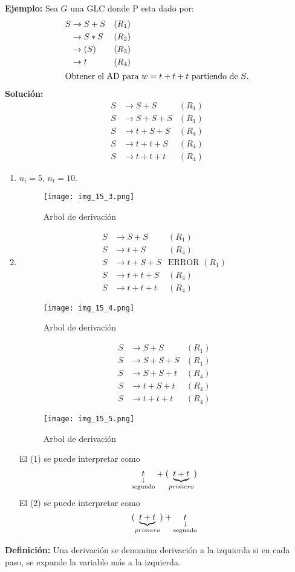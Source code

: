 \textbf{Ejemplo: }Sea $G$ una GLC donde P esta dado por:
\begin{align*}
S	&\rightarrow S+S	&(R_1)	\\
	&\rightarrow S*S	&(R_2)	\\
	&\rightarrow (S)	&(R_3)	\\
	&\rightarrow t		&(R_4)	\\
\intertext{Obtener el AD para $w=t+t+t$ partiendo de $S$.}
\end{align*}
\textbf{Solución: }
\begin{align*}
S	&\rightarrow S+S	&(R_1)	\\
S	&\rightarrow S+S+S	&(R_1)	\\
S	&\rightarrow t+S+S	&(R_4)	\\
S	&\rightarrow t+t+S	&(R_4)	\\
S	&\rightarrow t+t+t	&(R_4)
\end{align*}
\begin{enumerate}
\item $n_i=5$, $n_t=10$.
\begin{figure}[h!]
\centering
\texttt{[image: img\_15\_3.png]}
\caption{Arbol de derivación}\label{img_15_3}
\end{figure}
\item 
\begin{align*}
S	&\rightarrow S+S	&(R_1)	\\
S	&\rightarrow t+S	&(R_4)	\\
S	&\rightarrow t+S+S	&\mbox{ERROR }(R_1)	\\
S	&\rightarrow t+t+S	&(R_4)	\\
S	&\rightarrow t+t+t	&(R_4)
\end{align*}
\begin{figure}[h!]
\centering
\texttt{[image: img\_15\_4.png]}
\caption{Arbol de derivación}\label{img_15_4}
\end{figure}

\begin{align*}
S	&\rightarrow S+S	&(R_1)	\\
S	&\rightarrow S+S+S	&(R_1)	\\
S	&\rightarrow S+S+t	&(R_4)	\\
S	&\rightarrow t+S+t	&(R_4)	\\
S	&\rightarrow t+t+t	&(R_4)
\end{align*}
\begin{figure}[h!]
\centering
\texttt{[image: img\_15\_5.png]}
\caption{Arbol de derivación}\label{img_15_5}
\end{figure}

El (1) se puede interpretar como
$$\downlegend{t}{segundo}+(\underbrace{t+t}_{primero})$$
El (2) se puede interpretar como
$$(\underbrace{t+t}_{primero})+\downlegend{t}{segundo}$$
\end{enumerate}
\textbf{Definición: }Una derivación se denomina derivación a la izquierda si en cada paso, se expande la variable más a la izquierda.

